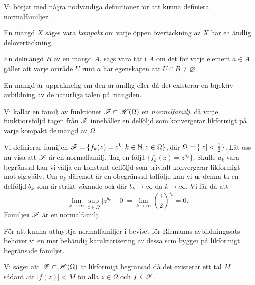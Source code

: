 Vi börjar med några nödvändiga definitioner för att kunna definiera normalfamiljer.
\begin{definition}
	En mängd $X$ säges vara \emph{kompakt} om varje öppen övertäckning av $X$ har en ändlig delövertäckning.
\end{definition}

\begin{definition} En delmängd $B$ av en mängd $A$, sägs vara tät i $A$ om det för varje element $a \in A$ gäller att varje område $U$ runt $a$ har egenskapen att $U \cap B \neq \varnothing$.
\end{definition}

\begin{definition}[Uppräknelig]
	En mängd är uppräknelig om den är ändlig eller då det existerar en bijektiv avbildning av de naturliga talen på mängden.
\end{definition}

\begin{definition}[Normalfamilj]
	Vi kallar en familj av funktioner $\mathscr{F} \subset \mathscr{H}(\Omega)$ en \emph{normalfamilj}, då varje funktionsföljd tagen från $\mathscr{F}$ innehåller en delföljd som konvergerar likformigt på varje kompakt delmängd av $\Omega$.
\end{definition}

\begin{example}
\label{ex:zk}
Vi definierar familjen $\mathscr{F} = \{ f_k(z) = z^k, k \in \mathbb{N}, z \in \Omega\}$, där $\Omega = \{\left\lvert z \right\rvert < \frac{1}{2}\}$. Låt oss nu visa att $\mathscr{F}$ är en normalfamilj. Tag en följd $\{ f_k(z) = z^{a_k} \}$. Skulle $a_k$ vara begränsad kan vi välja en konstant delföljd som trivialt konvergerar likformigt mot sig själv. Om $a_k$ däremot är en obegränsad talföljd kan vi ur denna ta en delföljd $b_k$ som är strikt växande och där $b_k \to \infty$ då $k \to \infty$. Vi får då att 
	\begin{equation*}
		\lim_{k \to \infty} \sup_{z \in \Omega} \vert z^{b_k} - 0 \vert =  \lim_{k \to \infty} \left(\frac{1}{2}\right)^{b_k} = 0.
	\end{equation*}
	Familjen $\mathscr{F}$ är en normalfamilj.
\end{example}

För att kunna uttnyttja normalfamiljer i beviset för Riemanns avbildningssats behöver vi en mer behändig karaktärisering av dessa som bygger på likformigt begränsade familjer.

\begin{definition}
	Vi säger att $\mathscr{F} \subset \mathscr{H}(\Omega)$ är likformigt begränsad då det existerar ett tal $M$ sådant att $\vert f(z) \vert < M$ för alla $z \in \Omega$ och $f \in \mathscr{F}$.
\end{definition}

